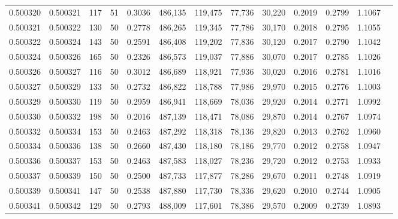 \begin{tabular}{rrrrrrrrrrrrr}
0.500320 & 0.500321 & 117 &  51 &                                     0.3036 & 486,135 & 119,475 &  77,736 &  30,220 & 0.2019 & 0.2799 & 1.1067 \\
0.500321 & 0.500322 & 130 &  50 &                                     0.2778 & 486,265 & 119,345 &  77,786 &  30,170 & 0.2018 & 0.2795 & 1.1055 \\
0.500322 & 0.500324 & 143 &  50 &                                     0.2591 & 486,408 & 119,202 &  77,836 &  30,120 & 0.2017 & 0.2790 & 1.1042 \\
0.500324 & 0.500326 & 165 &  50 &                                     0.2326 & 486,573 & 119,037 &  77,886 &  30,070 & 0.2017 & 0.2785 & 1.1026 \\
0.500326 & 0.500327 & 116 &  50 &                                     0.3012 & 486,689 & 118,921 &  77,936 &  30,020 & 0.2016 & 0.2781 & 1.1016 \\
0.500327 & 0.500329 & 133 &  50 &                                     0.2732 & 486,822 & 118,788 &  77,986 &  29,970 & 0.2015 & 0.2776 & 1.1003 \\
0.500329 & 0.500330 & 119 &  50 &                                     0.2959 & 486,941 & 118,669 &  78,036 &  29,920 & 0.2014 & 0.2771 & 1.0992 \\
0.500330 & 0.500332 & 198 &  50 &                                     0.2016 & 487,139 & 118,471 &  78,086 &  29,870 & 0.2014 & 0.2767 & 1.0974 \\
0.500332 & 0.500334 & 153 &  50 &                                     0.2463 & 487,292 & 118,318 &  78,136 &  29,820 & 0.2013 & 0.2762 & 1.0960 \\
0.500334 & 0.500336 & 138 &  50 &                                     0.2660 & 487,430 & 118,180 &  78,186 &  29,770 & 0.2012 & 0.2758 & 1.0947 \\
0.500336 & 0.500337 & 153 &  50 &                                     0.2463 & 487,583 & 118,027 &  78,236 &  29,720 & 0.2012 & 0.2753 & 1.0933 \\
0.500337 & 0.500339 & 150 &  50 &                                     0.2500 & 487,733 & 117,877 &  78,286 &  29,670 & 0.2011 & 0.2748 & 1.0919 \\
0.500339 & 0.500341 & 147 &  50 &                                     0.2538 & 487,880 & 117,730 &  78,336 &  29,620 & 0.2010 & 0.2744 & 1.0905 \\
0.500341 & 0.500342 & 129 &  50 &                                     0.2793 & 488,009 & 117,601 &  78,386 &  29,570 & 0.2009 & 0.2739 & 1.0893 \\

\end{tabular}
